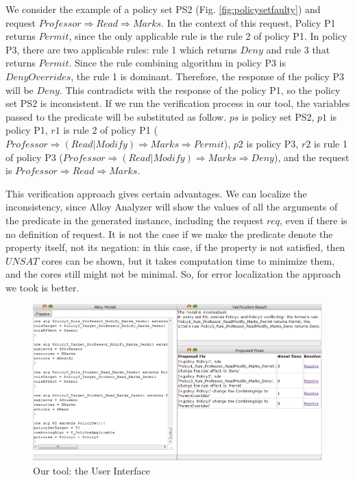 \documentclass[letterpaper]{acm_proc_article-sp}
\begin{document}
We consider the example of a policy set PS2 (Fig. \ref{fig:policysetfaulty}) and request $Professor \Rightarrow Read \Rightarrow Marks$. In the context of this request, Policy P1 returns $Permit$, since the only applicable rule is the rule 2 of policy P1. In policy P3, there are two applicable rules: rule 1 which returns $Deny$ and rule 3 that returns $Permit$. Since the rule combining algorithm in policy P3 is $DenyOverrides$, the rule 1 is dominant. Therefore, the response of the policy P3 will be $Deny$. This contradicts with the response of the policy P1, so the policy set PS2 is inconsistent. If we run the verification process in our tool, the variables passed to the predicate will be substituted as follow.  $ps$ is policy set PS2, $p1$ is policy P1, $r1$ is rule 2 of policy P1 ($Professor \Rightarrow (Read|Modify) \Rightarrow Marks \Rightarrow Permit$), $p2$ is policy P3, $r2$ is rule 1 of policy P3 ($Professor \Rightarrow (Read|Modify) \Rightarrow Marks \Rightarrow Deny$), and the request is $Professor \Rightarrow Read \Rightarrow Marks$.

This verification approach gives certain advantages. We can localize the inconsistency, since Alloy Analyzer will show the values of all the arguments of the predicate in the generated instance, including the request $req$, even if there is no definition of request. It is not the case if we make the predicate denote the property itself, not its negation: in this case, if the property is not satisfied, then $UNSAT$ cores can be shown, but it takes computation time to minimize them, and the cores still might not be minimal. So, for error localization the approach we took is better.

\begin{figure}[ht]
\includegraphics[width=\textwidth]{tool.png}
\caption{Our tool: the User Interface}    
  \label{fig:tool}
\end{figure}
\end{document}
